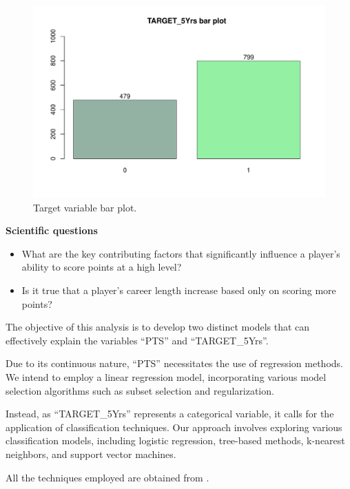 \begin{figure}[H]
	\centering
	\includegraphics[width=0.5\linewidth]{ImageFiles/Histograms/bp_target5yrs.pdf}
	\caption{Target variable bar plot.}
	\label{fig:target_bar_plot}
\end{figure}

\textbf{Scientific questions}
\begin{itemize}
	\item What are the key contributing factors that significantly influence a player's ability to score points at a high level?
	\item Is it true that a player's career length increase based only on scoring more points?
\end{itemize}

\noindent
The objective of this analysis is to develop two distinct models that can effectively explain the variables ``PTS'' and ``TARGET\_5Yrs''. 
 
Due to its continuous nature, ``PTS'' necessitates the use of regression methods. We intend to employ a linear regression model, incorporating various model selection algorithms such as subset selection and regularization.

Instead, as ``TARGET\_5Yrs'' represents a categorical variable, it calls for the application of classification techniques. Our approach involves exploring various classification models, including logistic regression, tree-based methods, k-nearest neighbors, and support vector machines.

All the techniques employed are obtained from \cite{James2013}.